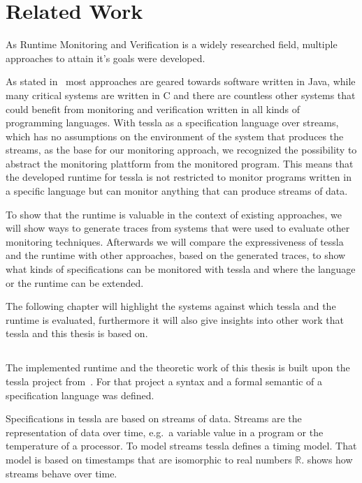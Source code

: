%
\chapter{Related Work}
\label{sec:related}

As Runtime Monitoring and Verification is a widely researched field, multiple approaches to attain it's goals were developed.

As stated in~\cite{Havelund2008} most approaches are geared towards software written in Java, while many critical systems are written in C and there are countless other systems that could benefit from monitoring and verification written in all kinds of programming languages.
With \gls{tessla} as a specification language over streams, which has no assumptions on the environment of the system that produces the streams,  as the base for our monitoring approach, we recognized the possibility to abstract the monitoring plattform from the monitored program.
This means that the developed runtime for \gls{tessla} is not restricted to monitor programs written in a specific language but can monitor anything that can produce streams of data.

To show that the runtime is valuable in the context of existing approaches, we will show ways to generate traces from systems that were used to evaluate other monitoring techniques.
Afterwards we will compare the expressiveness of \gls{tessla} and the runtime with other approaches, based on the generated traces, to show what kinds of specifications can be monitored with \gls{tessla} and where the language or the runtime can be extended.

The following chapter will highlight the systems against which \gls{tessla} and the runtime is evaluated, furthermore it will also give insights into other work that \gls{tessla} and this thesis is based on.

\section{}
\label{sec:related:tessla}

The implemented runtime and the theoretic work of this thesis is built upon the \gls{tessla} project from~\cite{Decker2016}.
For that project a syntax and a formal semantic of a specification language was defined.

Specifications in \gls{tessla} are based on streams of data.
Streams are the representation of data over time, e.g.\ a variable value in a program or the temperature of a processor.
To model streams \gls{tessla} defines a timing model.
That model is based on timestamps that are isomorphic to real numbers \(\mathbb{R}\).
 shows how streams behave over time.

